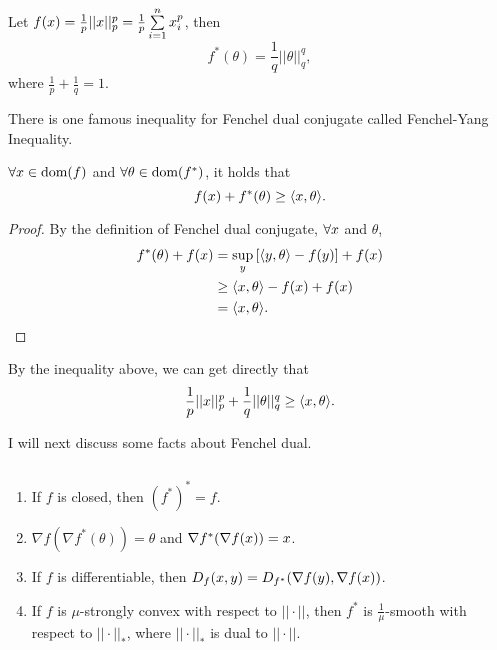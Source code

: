 \documentclass[../main.tex]{subfiles}
\begin{document}
\begin{example}
	Let $f(x) = \frac{1}{p} ||x||_p^p = \frac{1}{p} \sum\limits_{i=1}^n x_i^p$, then
	\begin{equation*}
		f^*(\theta) = \frac{1}{q} ||\theta||_q^q,
	\end{equation*}
	where $\frac{1}{p} + \frac{1}{q} = 1$.
\end{example}

There is one famous inequality for Fenchel dual conjugate called Fenchel-Yang Inequality.

\begin{theorem}
	$\forall x \in \textmd{dom}(f)$ and $\forall \theta \in \textmd{dom}(f^*)$, it holds that 
	\begin{equation}
	f(x) + f^*(\theta) \geq \langle x, \theta \rangle.
	\end{equation}
\end{theorem}

\begin{proof}
	By the definition of Fenchel dual conjugate, $\forall x$ and $\theta$,
	\begin{equation*}
	\begin{aligned}
		f^*(\theta) + f(x) & = \sup_y \left[ \langle y, \theta \rangle - f(y)\right] +f(x) \\
		&\geq  \langle x, \theta \rangle - f(x) + f(x) \\
		& = \langle x, \theta \rangle.
	\end{aligned}
	\end{equation*}
\end{proof}

\begin{corollary}
	By the inequality above, we can get directly that
	\begin{equation*}
		\frac{1}{p} ||x||_p^p + \frac{1}{q} ||\theta||_q^q \geq \langle x, \theta\rangle. 
	\end{equation*}
\end{corollary}

I will next discuss some facts about Fenchel dual.
\begin{fact}$ $
	\begin{enumerate}
		\item If $f$ is closed, then $(f^*)^* = f$.
		\item $\nabla f (\nabla f^*(\theta)) = \theta$ and $\nabla f^*(\nabla f(x)) =x$.
		\item If $f$ is differentiable, then $D_f(x,y) = D_{f^*}(\nabla f(y), \nabla f(x))$.
		\item If $f$ is $\mu$-strongly convex with respect to $||\cdot||$, then $f^*$ is $\frac{1}{\mu}$-smooth with respect to $||\cdot||_*$, where $||\cdot||_*$ is dual to $||\cdot||$.
	\end{enumerate}
\end{fact}
\end{document}
